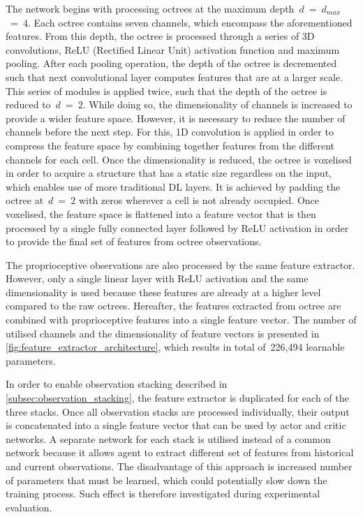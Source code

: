 The network begins with processing octrees at the maximum depth~\(d\)~=~\(d_{max}\)~=~\(4\). Each octree contains seven channels, which encompass the aforementioned features. From this depth, the octree is processed through a series of 3D convolutions, ReLU (Rectified Linear Unit) activation function and maximum pooling. After each pooling operation, the depth of the octree is decremented such that next convolutional layer computes features that are at a larger scale. This series of modules is applied twice, such that the depth of the octree is reduced to~\(d\)~=~\(2\). While doing so, the dimensionality of channels is increased to provide a wider feature space. However, it is necessary to reduce the number of channels before the next step. For this, 1D convolution is applied in order to compress the feature space by combining together features from the different channels for each cell. Once the dimensionality is reduced, the octree is voxelised in order to acquire a structure that has a static size regardless on the input, which enables use of more traditional DL layers. It is achieved by padding the octree at~\(d\)~=~\(2\) with zeros wherever a cell is not already occupied. Once voxelised, the feature space is flattened into a feature vector that is then processed by a single fully connected layer followed by ReLU activation in order to provide the final set of features from octree observations.

The proprioceptive observations are also processed by the same feature extractor. However, only a single linear layer with ReLU activation and the same dimensionality is used because these features are already at a higher level compared to the raw octrees. Hereafter, the features extracted from octree are combined with proprioceptive features into a single feature vector. The number of utilised channels and the dimensionality of feature vectors is presented in \autoref{fig:feature_extractor_architecture}, which results in total of~226,494 learnable parameters.

In order to enable observation stacking described in \autoref{subsec:observation_stacking}, the feature extractor is duplicated for each of the three stacks. Once all observation stacks are processed individually, their output is concatenated into a single feature vector that can be used by actor and critic networks. A separate network for each stack is utilised instead of a common network because it allows agent to extract different set of features from historical and current observations. The disadvantage of this approach is increased number of parameters that must be learned, which could potentially slow down the training process. Such effect is therefore investigated during experimental evaluation.


